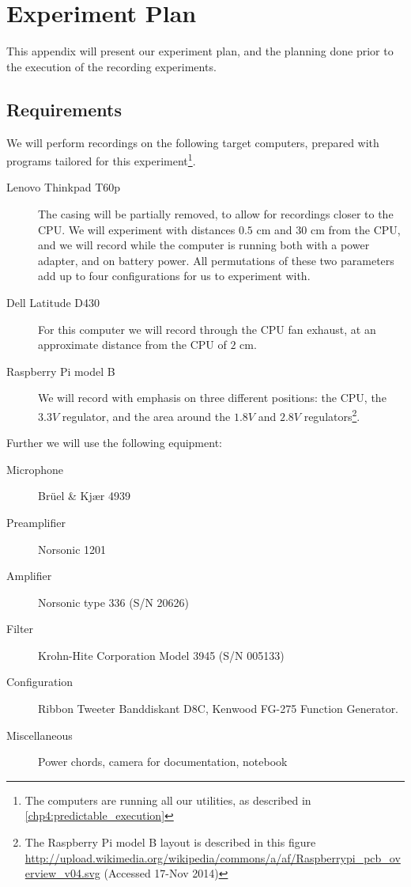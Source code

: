 \chapter{Experiment Plan}\label{apx:experiment_plan}
This appendix will present our experiment plan, and the planning done prior to the execution of the recording experiments.

\section{Requirements}

We will perform recordings on the following target computers, prepared with programs tailored for this experiment\footnote{The computers are running all our utilities, as described in \autoref{chp4:predictable_execution}}.
\begin{description}
	\item[Lenovo Thinkpad T60p] The casing will be partially removed, to allow for recordings closer to the CPU. We will experiment with distances $0.5$ cm and $30$ cm from the CPU, and we will record while the computer is running both with a power adapter, and on battery power. All permutations of these two parameters add up to four configurations for us to experiment with.
	\item[Dell Latitude D430] For this computer we will record through the CPU fan exhaust, at an approximate distance from the CPU of $2$ cm.
	\item[Raspberry Pi model B] We will record with emphasis on three different positions: the CPU, the $3.3V$ regulator, and the area around the $1.8V$ and $2.8V$ regulators\footnote{The Raspberry Pi model B layout is described in this figure \url{http://upload.wikimedia.org/wikipedia/commons/a/af/Raspberrypi_pcb_overview_v04.svg} (Accessed 17-Nov 2014)}.
\end{description}

Further we will use the following equipment:
\begin{description}
	\item[Microphone] Brüel \& Kjær 4939
	\item[Preamplifier] Norsonic 1201
	\item[Amplifier] Norsonic type 336 (S/N 20626)
	\item[Filter] Krohn-Hite Corporation Model 3945 (S/N 005133)
	\item[Configuration] Ribbon Tweeter Banddiskant D8C, Kenwood FG-275 Function Generator.
	\item[Miscellaneous] Power chords, camera for documentation, notebook
\end{description}


